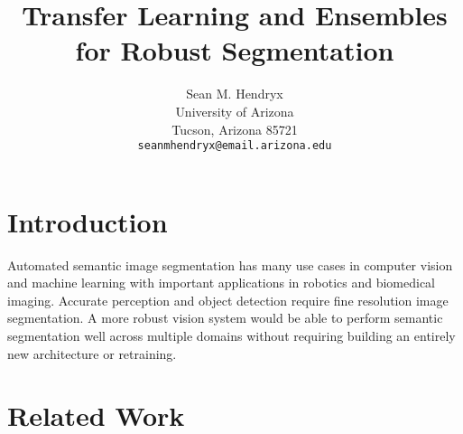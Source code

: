 \documentclass[10pt,twocolumn,letterpaper]{article}
\begin{document}
\title{Transfer Learning and Ensembles for Robust Segmentation}

\author{Sean M. Hendryx\\
University of Arizona\\
Tucson, Arizona 85721\\
{\tt\small seanmhendryx@email.arizona.edu}
}

\maketitle

\doublespacing

\begin{abstract}

\end{abstract}

\section{Introduction}

Automated semantic image segmentation has many use cases in computer vision and
machine learning with important applications in robotics and biomedical imaging.
Accurate perception and object detection require fine resolution image segmentation.
A more robust vision system would be able to perform semantic segmentation well across
multiple domains without requiring building an entirely new architecture or retraining.


\section{Related Work}
\end{document}
